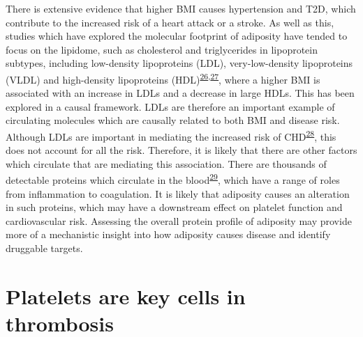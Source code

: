 \documentclass[11pt,twoside]{bristolthesis}
\begin{document}
There is extensive evidence that higher BMI causes hypertension and T2D, which contribute to the increased risk of a heart attack or a stroke. As well as this, studies which have explored the molecular footprint of adiposity have tended to focus on the lipidome, such as cholesterol and triglycerides in lipoprotein subtypes, including low-density lipoproteins (LDL), very-low-density lipoproteins (VLDL) and high-density lipoproteins (HDL)\textsuperscript{\protect\hyperlink{ref-Bell2018a}{26},\protect\hyperlink{ref-Wurtz2014}{27}}, where a higher BMI is associated with an increase in LDLs and a decrease in large HDLs. This has been explored in a causal framework. LDLs are therefore an important example of circulating molecules which are causally related to both BMI and disease risk. Although LDLs are important in mediating the increased risk of CHD\textsuperscript{\protect\hyperlink{ref-Lu2014}{28}}, this does not account for all the risk. Therefore, it is likely that there are other factors which circulate that are mediating this association. There are thousands of detectable proteins which circulate in the blood\textsuperscript{\protect\hyperlink{ref-Sun2018}{29}}, which have a range of roles from inflammation to coagulation. It is likely that adiposity causes an alteration in such proteins, which may have a downstream effect on platelet function and cardiovascular risk. Assessing the overall protein profile of adiposity may provide more of a mechanistic insight into how adiposity causes disease and identify druggable targets.

\hypertarget{platelets-are-key-cells-in-thrombosis}{%
\section{Platelets are key cells in thrombosis}\label{platelets-are-key-cells-in-thrombosis}}
\end{document}
